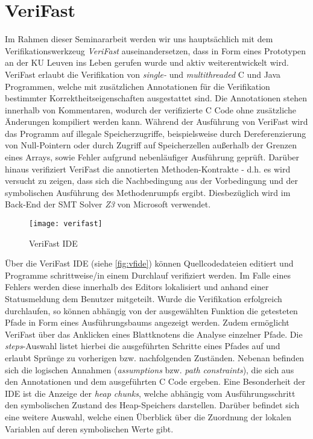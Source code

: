 \section{VeriFast}

Im Rahmen dieser Seminararbeit werden wir uns hauptsächlich mit dem Verifikationswerkzeug \emph{VeriFast} auseinandersetzen, dass in Form eines Prototypen an der KU Leuven ins Leben gerufen wurde und aktiv weiterentwickelt wird. VeriFast erlaubt die Verifikation von \emph{single-} und \emph{multithreaded} C und Java Programmen, welche mit zusätzlichen Annotationen für die Verifikation bestimmter Korrektheitseigenschaften ausgestattet sind. Die Annotationen stehen innerhalb von Kommentaren, wodurch der verifizierte C Code ohne zusätzliche Änderungen kompiliert werden kann. Während der Ausführung von VeriFast wird das Programm auf illegale Speicherzugriffe, beispielsweise durch Dereferenzierung von Null-Pointern oder durch Zugriff auf Speicherzellen außerhalb der Grenzen eines Arrays, sowie Fehler aufgrund nebenläufiger Ausführung geprüft. Darüber hinaus verifiziert VeriFast die annotierten Methoden-Kontrakte - d.h. es wird versucht zu zeigen, dass sich die Nachbedingung aus der Vorbedingung und der symbolischen Ausführung des Methodenrumpfs ergibt. Diesbezüglich wird im Back-End der SMT Solver \emph{Z3} von Microsoft verwendet. \cite{Jacobs2010}

\begin{figure}[!hbt]
	\centering
	\texttt{[image: verifast]}
	\caption{VeriFast IDE}
	\label{fig:vfide}
\end{figure}

\noindent
Über die VeriFast IDE (siehe \vref{fig:vfide}) können Quellcodedateien editiert und Programme schrittweise/in einem Durchlauf verifiziert werden. Im Falle eines Fehlers werden diese innerhalb des Editors lokalisiert und anhand einer Statusmeldung dem Benutzer mitgeteilt. Wurde die Verifikation erfolgreich durchlaufen, so können abhängig von der ausgewählten Funktion die getesteten Pfade in Form eines Ausführungsbaums angezeigt werden. Zudem ermöglicht VeriFast über das Anklicken eines Blattknotens die Analyse einzelner Pfade. Die \emph{steps}-Auswahl listet hierbei die ausgeführten Schritte eines Pfades auf und erlaubt Sprünge zu vorherigen bzw. nachfolgenden Zuständen. Nebenan befinden sich die logischen Annahmen (\emph{assumptions} bzw. \emph{path constraints}), die sich aus den Annotationen und dem ausgeführten C Code ergeben. Eine Besonderheit der IDE ist die Anzeige der \emph{heap chunks}, welche abhängig vom Ausführungsschritt den symbolischen Zustand des Heap-Speichers darstellen. Darüber befindet sich eine weitere Auswahl, welche einen Überblick über die Zuordnung der lokalen Variablen auf deren symbolischen Werte gibt.

